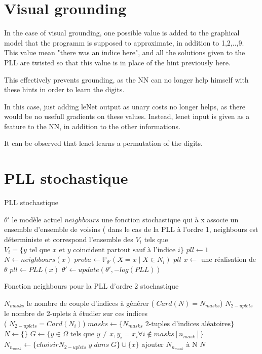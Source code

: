\documentclass[11 pt]{article}
\begin{document}
\section{Visual grounding}

In the case of visual grounding, one possible value is added to the graphical model that the programm is supposed to approximate, in addition to 1,2,..,9. This value mean "there was an indice here", and all the solutions given to the PLL are twisted so that this value is in place of the hint previously here. 

This effectively prevents grounding, as the NN can no longer help himself with these hints in order to learn the digits.

In this case, just adding leNet output as unary costs no longer helps, as there would be no usefull gradients on these values. Instead, lenet input is given as a feature to the NN, in addition to the other informations.

It can be observed that lenet learns a permutation of the digits.



\section{PLL stochastique}
\begin{algorithm}
\caption{PLL stochastique}\label{alg:pll}
\begin{algorithmic}
\Require $\theta '$ le modèle actuel 
\Require $neighbours$ une fonction stochastique qui à x associe un ensemble d'ensemble de voisins ( dans le cas de la PLL à l'ordre 1, neighbours est déterministe et correspond l'ensemble des  $V_i$ tels que $V_i = \{y \text{ tel que $x$ et $y$ coincident partout sauf à l'indice $i$}\}$
\State $pll \gets 1$
\State $N \gets neighbours(x) $
\State $proba \gets \mathbb{P}_{\theta '} (X=x \mid X \in N_i)$  
\EndFor
\Return $pll$
\EndFunction
{}
\State $x \gets$ une réalisation de $\theta$
\State $pll \gets PLL(x)$
\State $\theta ' \gets update(\theta ', -log(PLL))$
\EndWhile
\end{algorithmic}
\end{algorithm}
\begin{algorithm}
\caption{Fonction neighbours pour la PLL d'ordre 2 stochastique}\label{alg:neig2}
\begin{algorithmic}
	\Require $N_{masks}$ le nombre de couple d'indices à générer ( $Card(N) = N_{masks} $)
	\Require $N_{2-uplets}$ le nombre de 2-uplets à étudier sur ces indices\\ ( $ N_{2-uplets} = Card(N_i) $)
\State $masks \gets  \{ N_{masks} \text{ 2-tuples d'indices aléatoires} \}$
\State $N \gets \{\}$
\State $G \gets \{ y \in \Omega \text{ tels que } y \neq x, y_i = x_i \forall i \notin masks[n_{mask}] \}$
\State $N_{n_{mask}} \gets \{choisir N_{2-uplets}\; y\; dans \; G\} \cup \{x\}$
\State ajouter $N_{n_{mask}}$ à N
\EndFor
\Return $N$
\EndFunction
\end{algorithmic}
\end{algorithm}
\end{document}
